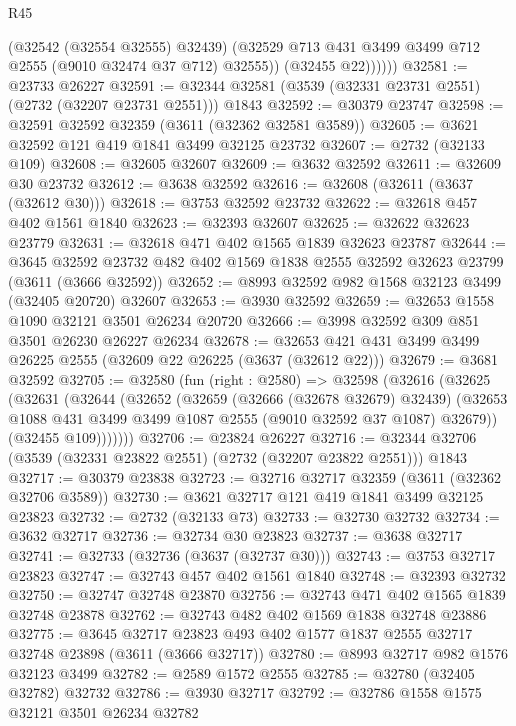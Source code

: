 \begin{lexlean}{R45}
\begin{coremodule}
                (@32542 (@32554 @32555) @32439)
                (@32529 @713 @431 @3499 @3499 @712 @2555 (@9010 @32474 @37 @712) @32555))
              (@32455 @22))))))
@32581 := @23733 @26227
@32591 := @32344 @32581 (@3539 (@32331 @23731 @2551) (@2732 (@32207 @23731 @2551))) @1843
@32592 := @30379 @23747
@32598 := @32591 @32592 @32359 (@3611 (@32362 @32581 @3589))
@32605 := @3621 @32592 @121 @419 @1841 @3499 @32125 @23732
@32607 := @2732 (@32133 @109)
@32608 := @32605 @32607
@32609 := @3632 @32592
@32611 := @32609 @30 @23732
@32612 := @3638 @32592
@32616 := @32608 (@32611 (@3637 (@32612 @30)))
@32618 := @3753 @32592 @23732
@32622 := @32618 @457 @402 @1561 @1840
@32623 := @32393 @32607
@32625 := @32622 @32623 @23779
@32631 := @32618 @471 @402 @1565 @1839 @32623 @23787
@32644 := @3645
    @32592
    @23732
    @482
    @402
    @1569
    @1838
    @2555
    @32592
    @32623
    @23799
    (@3611 (@3666 @32592))
@32652 := @8993 @32592 @982 @1568 @32123 @3499 (@32405 @20720) @32607
@32653 := @3930 @32592
@32659 := @32653 @1558 @1090 @32121 @3501 @26234 @20720
@32666 := @3998 @32592 @309 @851 @3501 @26230 @26227 @26234
@32678 := @32653 @421 @431 @3499 @3499 @26225 @2555 (@32609 @22 @26225 (@3637 (@32612 @22)))
@32679 := @3681 @32592
@32705 := @32580
    (fun (right : @2580) =>
    @32598
      (@32616
        (@32625
          (@32631
            (@32644
              (@32652
                (@32659
                  (@32666 (@32678 @32679) @32439)
                  (@32653 @1088 @431 @3499 @3499 @1087 @2555 (@9010 @32592 @37 @1087) @32679))
                (@32455 @109)))))))
@32706 := @23824 @26227
@32716 := @32344 @32706 (@3539 (@32331 @23822 @2551) (@2732 (@32207 @23822 @2551))) @1843
@32717 := @30379 @23838
@32723 := @32716 @32717 @32359 (@3611 (@32362 @32706 @3589))
@32730 := @3621 @32717 @121 @419 @1841 @3499 @32125 @23823
@32732 := @2732 (@32133 @73)
@32733 := @32730 @32732
@32734 := @3632 @32717
@32736 := @32734 @30 @23823
@32737 := @3638 @32717
@32741 := @32733 (@32736 (@3637 (@32737 @30)))
@32743 := @3753 @32717 @23823
@32747 := @32743 @457 @402 @1561 @1840
@32748 := @32393 @32732
@32750 := @32747 @32748 @23870
@32756 := @32743 @471 @402 @1565 @1839 @32748 @23878
@32762 := @32743 @482 @402 @1569 @1838 @32748 @23886
@32775 := @3645
    @32717
    @23823
    @493
    @402
    @1577
    @1837
    @2555
    @32717
    @32748
    @23898
    (@3611 (@3666 @32717))
@32780 := @8993 @32717 @982 @1576 @32123 @3499
@32782 := @2589 @1572 @2555
@32785 := @32780 (@32405 @32782) @32732
@32786 := @3930 @32717
@32792 := @32786 @1558 @1575 @32121 @3501 @26234 @32782

\end{coremodule}
\end{lexlean}
